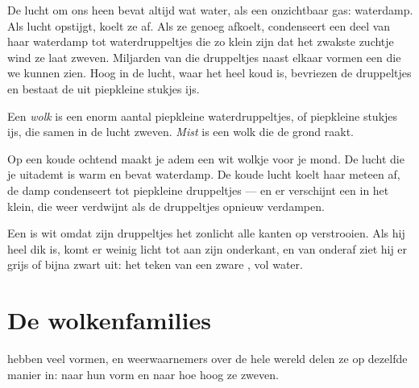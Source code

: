 De lucht om ons heen bevat altijd wat water, als een onzichtbaar gas:
waterdamp. Als lucht opstijgt, koelt ze af. Als ze genoeg afkoelt,
condenseert een deel van haar waterdamp tot waterdruppeltjes die zo klein
zijn dat het zwakste zuchtje wind ze laat zweven. Miljarden van die
druppeltjes naast elkaar vormen een  die we kunnen zien. Hoog in de
lucht, waar het heel koud is, bevriezen de druppeltjes en bestaat de 
uit piepkleine stukjes ijs.

\begin{definition}\label{def:g4:clouds-rain-snow:cloud}
Een \emph{wolk} is een enorm aantal piepkleine waterdruppeltjes,
of piepkleine stukjes ijs, die samen in de lucht zweven. \emph{Mist}
is een wolk die de grond raakt.
\end{definition}

\begin{example}\label{ex:g4:clouds-rain-snow:breath}
Op een koude ochtend maakt je adem een wit wolkje voor je mond. De lucht
die je uitademt is warm en bevat waterdamp. De koude lucht koelt haar
meteen af, de damp condenseert tot piepkleine druppeltjes --- en er
verschijnt een  in het klein, die weer verdwijnt als de druppeltjes
opnieuw verdampen.
\end{example}

Een  is wit omdat zijn druppeltjes het zonlicht alle kanten op
verstrooien. Als hij heel dik is, komt er weinig licht tot aan zijn
onderkant, en van onderaf ziet hij er grijs of bijna zwart uit: het teken
van een zware , vol water.

\section{De wolkenfamilies}

 hebben veel vormen, en weerwaarnemers over de hele wereld delen ze
op dezelfde manier in: naar hun vorm en naar hoe hoog ze zweven.

